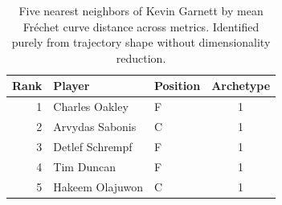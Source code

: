 \begin{table}[htbp]
  \centering\small
  \begin{tabular}{rllc}
    \toprule
    Rank & Player & Position & Archetype \\
    \midrule
    1 & Charles Oakley & F & 1 \\
    2 & Arvydas Sabonis & C & 1 \\
    3 & Detlef Schrempf & F & 1 \\
    4 & Tim Duncan & F & 1 \\
    5 & Hakeem Olajuwon & C & 1 \\
    \bottomrule
  \end{tabular}
  \caption{Five nearest neighbors of Kevin Garnett by mean Fr\'{e}chet curve distance across metrics. Identified purely from trajectory shape without dimensionality reduction.}
  \label{tab:Kevin_Garnett_frechet_curve_neighbors}
\end{table}

